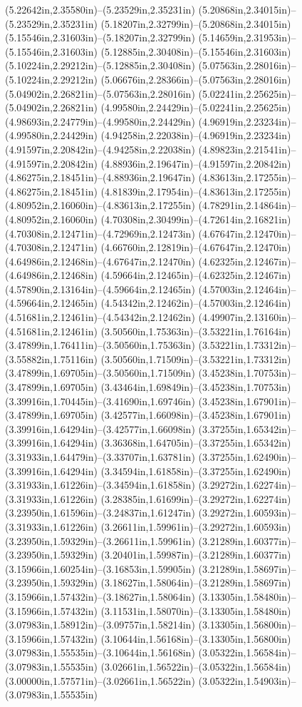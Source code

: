 (5.22642in,2.35580in)--(5.23529in,2.35231in) (5.20868in,2.34015in)--(5.23529in,2.35231in) (5.18207in,2.32799in)--(5.20868in,2.34015in) (5.15546in,2.31603in)--(5.18207in,2.32799in) (5.14659in,2.31953in)--(5.15546in,2.31603in) (5.12885in,2.30408in)--(5.15546in,2.31603in) (5.10224in,2.29212in)--(5.12885in,2.30408in) (5.07563in,2.28016in)--(5.10224in,2.29212in) (5.06676in,2.28366in)--(5.07563in,2.28016in) (5.04902in,2.26821in)--(5.07563in,2.28016in) (5.02241in,2.25625in)--(5.04902in,2.26821in) (4.99580in,2.24429in)--(5.02241in,2.25625in) (4.98693in,2.24779in)--(4.99580in,2.24429in) (4.96919in,2.23234in)--(4.99580in,2.24429in) (4.94258in,2.22038in)--(4.96919in,2.23234in) (4.91597in,2.20842in)--(4.94258in,2.22038in) (4.89823in,2.21541in)--(4.91597in,2.20842in) (4.88936in,2.19647in)--(4.91597in,2.20842in) (4.86275in,2.18451in)--(4.88936in,2.19647in) (4.83613in,2.17255in)--(4.86275in,2.18451in) (4.81839in,2.17954in)--(4.83613in,2.17255in) (4.80952in,2.16060in)--(4.83613in,2.17255in) (4.78291in,2.14864in)--(4.80952in,2.16060in) (4.70308in,2.30499in)--(4.72614in,2.16821in) (4.70308in,2.12471in)--(4.72969in,2.12473in) (4.67647in,2.12470in)--(4.70308in,2.12471in) (4.66760in,2.12819in)--(4.67647in,2.12470in) (4.64986in,2.12468in)--(4.67647in,2.12470in) (4.62325in,2.12467in)--(4.64986in,2.12468in) (4.59664in,2.12465in)--(4.62325in,2.12467in) (4.57890in,2.13164in)--(4.59664in,2.12465in) (4.57003in,2.12464in)--(4.59664in,2.12465in) (4.54342in,2.12462in)--(4.57003in,2.12464in) (4.51681in,2.12461in)--(4.54342in,2.12462in) (4.49907in,2.13160in)--(4.51681in,2.12461in) (3.50560in,1.75363in)--(3.53221in,1.76164in) (3.47899in,1.76411in)--(3.50560in,1.75363in) (3.53221in,1.73312in)--(3.55882in,1.75116in) (3.50560in,1.71509in)--(3.53221in,1.73312in) (3.47899in,1.69705in)--(3.50560in,1.71509in) (3.45238in,1.70753in)--(3.47899in,1.69705in) (3.43464in,1.69849in)--(3.45238in,1.70753in) (3.39916in,1.70445in)--(3.41690in,1.69746in) (3.45238in,1.67901in)--(3.47899in,1.69705in) (3.42577in,1.66098in)--(3.45238in,1.67901in) (3.39916in,1.64294in)--(3.42577in,1.66098in) (3.37255in,1.65342in)--(3.39916in,1.64294in) (3.36368in,1.64705in)--(3.37255in,1.65342in) (3.31933in,1.64479in)--(3.33707in,1.63781in) (3.37255in,1.62490in)--(3.39916in,1.64294in) (3.34594in,1.61858in)--(3.37255in,1.62490in) (3.31933in,1.61226in)--(3.34594in,1.61858in) (3.29272in,1.62274in)--(3.31933in,1.61226in) (3.28385in,1.61699in)--(3.29272in,1.62274in) (3.23950in,1.61596in)--(3.24837in,1.61247in) (3.29272in,1.60593in)--(3.31933in,1.61226in) (3.26611in,1.59961in)--(3.29272in,1.60593in) (3.23950in,1.59329in)--(3.26611in,1.59961in) (3.21289in,1.60377in)--(3.23950in,1.59329in) (3.20401in,1.59987in)--(3.21289in,1.60377in) (3.15966in,1.60254in)--(3.16853in,1.59905in) (3.21289in,1.58697in)--(3.23950in,1.59329in) (3.18627in,1.58064in)--(3.21289in,1.58697in) (3.15966in,1.57432in)--(3.18627in,1.58064in) (3.13305in,1.58480in)--(3.15966in,1.57432in) (3.11531in,1.58070in)--(3.13305in,1.58480in) (3.07983in,1.58912in)--(3.09757in,1.58214in) (3.13305in,1.56800in)--(3.15966in,1.57432in) (3.10644in,1.56168in)--(3.13305in,1.56800in) (3.07983in,1.55535in)--(3.10644in,1.56168in) (3.05322in,1.56584in)--(3.07983in,1.55535in) (3.02661in,1.56522in)--(3.05322in,1.56584in) (3.00000in,1.57571in)--(3.02661in,1.56522in) (3.05322in,1.54903in)--(3.07983in,1.55535in) 